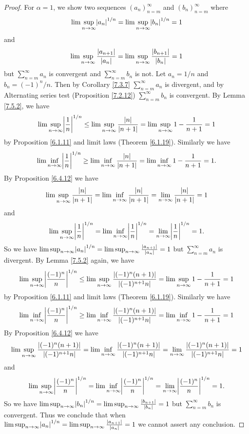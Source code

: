 \begin{proof}
    For \(\alpha = 1\), we show two sequences \((a_n)_{n = m}^\infty\) and \((b_n)_{n = m}^\infty\) where
    \[
        \lim\sup_{n \to \infty} \abs*{a_n}^{1 / n} = \lim\sup_{n \to \infty} \abs*{b_n}^{1 / n} = 1
    \]
    and
    \[
        \lim\sup_{n \to \infty} \frac{\abs*{a_{n + 1}}}{\abs*{a_n}} = \lim\sup_{n \to \infty} \frac{\abs*{b_{n + 1}}}{\abs*{b_n}} = 1
    \]
    but \(\sum_{n = m}^\infty a_n\) is convergent and \(\sum_{n = m}^\infty b_n\) is not.
    Let \(a_n = 1 / n\) and \(b_n = (-1)^n / n\).
    Then by Corollary \ref{7.3.7} \(\sum_{n = m}^\infty a_n\) is divergent, and by Alternating series test (Proposition \ref{7.2.12}) \(\sum_{n = m}^\infty b_n\) is convergent.
    By Lemma \ref{7.5.2}, we have
    \[
        \lim\sup_{n \to \infty} \abs*{\frac{1}{n}}^{1 / n} \leq \lim\sup_{n \to \infty} \frac{\abs*{n}}{\abs*{n + 1}} = \lim\sup_{n \to \infty} 1 - \frac{1}{n + 1} = 1
    \]
    by Proposition \ref{6.1.11} and limit laws (Theorem \ref{6.1.19}).
    Similarly we have
    \[
        \lim\inf_{n \to \infty} \abs*{\frac{1}{n}}^{1 / n} \geq \lim\inf_{n \to \infty} \frac{\abs*{n}}{\abs*{n + 1}} = \lim\inf_{n \to \infty} 1 - \frac{1}{n + 1} = 1.
    \]
    By Proposition \ref{6.4.12} we have
    \[
        \lim\sup_{n \to \infty} \frac{\abs*{n}}{\abs*{n + 1}} = \lim\inf_{n \to \infty} \frac{\abs*{n}}{\abs*{n + 1}} = \lim_{n \to \infty} \frac{\abs*{n}}{\abs*{n + 1}} = 1
    \]
    and
    \[
        \lim\sup_{n \to \infty} \abs*{\frac{1}{n}}^{1 / n} = \lim\inf_{n \to \infty} \abs*{\frac{1}{n}}^{1 / n} = \lim_{n \to \infty} \abs*{\frac{1}{n}}^{1 / n} = 1.
    \]
    So we have \(\lim\sup_{n \to \infty} \abs*{a_n}^{1 / n} = \lim\sup_{n \to \infty} \frac{\abs*{a_{n + 1}}}{\abs*{a_n}} = 1\) but \(\sum_{n = m}^\infty a_n\) is divergent.
    By Lemma \ref{7.5.2} again, we have
    \[
        \lim\sup_{n \to \infty} \abs*{\frac{(-1)^n}{n}}^{1 / n} \leq \lim\sup_{n \to \infty} \frac{\abs*{(-1)^n (n + 1)}}{\abs*{(-1)^{n + 1} n}} = \lim\sup_{n \to \infty} 1 - \frac{1}{n + 1} = 1
    \]
    by Proposition \ref{6.1.11} and limit laws (Theorem \ref{6.1.19}).
    Similarly we have
    \[
        \lim\inf_{n \to \infty} \abs*{\frac{(-1)^n}{n}}^{1 / n} \geq \lim\inf_{n \to \infty} \frac{\abs*{(-1)^n (n + 1)}}{\abs*{(-1)^{n + 1} n}} = \lim\inf_{n \to \infty} 1 - \frac{1}{n + 1} = 1
    \]
    By Proposition \ref{6.4.12} we have
    \[
        \lim\sup_{n \to \infty} \frac{\abs*{(-1)^n (n + 1)}}{\abs*{(-1)^{n + 1} n}} = \lim\inf_{n \to \infty} \frac{\abs*{(-1)^n (n + 1)}}{\abs*{(-1)^{n + 1} n}} = \lim_{n \to \infty} \frac{\abs*{(-1)^n (n + 1)}}{\abs*{(-1)^{n + 1} n}} = 1
    \]
    and
    \[
        \lim\sup_{n \to \infty} \abs*{\frac{(-1)^n}{n}}^{1 / n} = \lim\inf_{n \to \infty} \abs*{\frac{(-1)^n}{n}}^{1 / n} = \lim_{n \to \infty} \abs*{\frac{(-1)^n}{n}}^{1 / n} = 1.
    \]
    So we have \(\lim\sup_{n \to \infty} \abs*{b_n}^{1 / n} = \lim\sup_{n \to \infty} \frac{\abs*{b_{n + 1}}}{\abs*{b_n}} = 1\) but \(\sum_{n = m}^\infty b_n\) is convergent.
    Thus we conclude that when \(\lim\sup_{n \to \infty} \abs*{a_n}^{1 / n} = \lim\sup_{n \to \infty} \frac{\abs*{a_{n + 1}}}{\abs*{a_n}} = 1\) we cannot assert any conclusion.
\end{proof}

